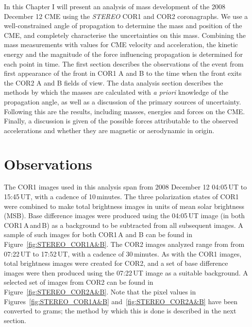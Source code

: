 In this Chapter I will present an analysis of mass development of the 2008 December 12 CME using the \emph{STEREO} COR1 and COR2 coronagraphs. We use a well-constrained angle of propagation to determine the mass and position of the CME, and completely characterise the uncertainties on this mass. Combining the mass measurements with values for CME velocity and acceleration, the kinetic energy and the magnitude of the force influencing propagation is determined for each point in time. The first section describes the observations of the event from first appearance of the front in COR1 A and B to the time when the front exits the COR2 A and B fields of view. 
The data analysis section describes the methods by which the masses are calculated with \emph{a priori} knowledge of the propagation angle, as well as a discussion of the primary sources of uncertainty. Following this are the results, including masses, energies and forces on the CME. Finally, a discussion is given of the possible forces attributable to the observed accelerations and whether they are magnetic or aerodynamic in origin. 

\section{Observations}

The COR1 images used in this analysis span from 2008 December 12 04:05\,UT to 15:45\,UT, with a cadence of 10\,minutes. The three polarization states of COR1 were combined to make total brightness images in units of mean solar brightness (MSB). Base difference images were produced using the 04:05\,UT image (in both COR1\,A\,and\,B) as a background to be subtracted from all subsequent images. A sample of such images for both COR1\,A and B can be found in Figure~\ref{fig:STEREO_COR1A&B}. The COR2 images analyzed range from from 07:22\,UT to 17:52\,UT, with a cadence of 30\,minutes. As with the COR1 images, total brightness images were created for COR2, and a set of base difference images were then produced using the 07:22\,UT image as a suitable background. A selected set of images from COR2 can be found in Figure~\ref{fig:STEREO_COR2A&B}. Note that the pixel values in Figures~\ref{fig:STEREO_COR1A&B} and~\ref{fig:STEREO_COR2A&B}  have been converted to grams; the method by which this is done is described in the next section.
	
